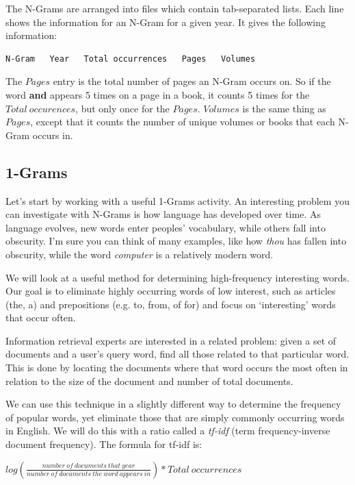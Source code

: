 \documentclass[letterpaper,10pt,openany,oneside]{sphinxmanual}
\begin{document}
The N-Grams are arranged into files
which contain tab-separated lists. Each line shows the information
for an N-Gram for a given year. It gives the following information:

\begin{Verbatim}[commandchars=\\\{\}]
N-Gram   Year   Total occurrences   Pages   Volumes
\end{Verbatim}

The $Pages$ entry is the total number of pages an N-Gram
occurs on. So if the word \textbf{and} appears 5 times on a page in a
book, it counts 5 times for the $Total \ occurences$, but
only once for the $Pages$. $Volumes$ is the same
thing as $Pages$, except that it counts the number of
unique volumes or books that each N-Gram occurs in.


\subsection{1-Grams}
\label{WmrActivities/WmrActivities:grams}
Let's start by working with a useful 1-Grams activity. An
interesting problem you can investigate with N-Grams is how
language has developed over time. As language evolves, new words
enter peoples' vocabulary, while others fall into obscurity. I'm
sure you can think of many examples, like how \emph{thou} has fallen
into obscurity, while the word \emph{computer} is a relatively modern
word.

We will look at a useful method for determining high-frequency
interesting words. Our goal is to eliminate highly occurring words
of low interest, such as articles (the, a) and prepositions (e.g.
to, from, of for) and focus on `interesting' words that occur
often.

Information retrieval experts are interested in a related problem:
given a set of documents and a user's query word, find all those
related to that particular word. This is done by locating the
documents where that word occurs the most often in relation to the
size of the document and number of total documents.

We can use this technique in a slightly different way to determine
the frequency of popular words, yet eliminate those that are simply
commonly occurring words in English. We will do this with a ratio
called a \emph{tf-idf} (term frequency-inverse document frequency). The
formula for tf-idf is:

$log\left( \frac{number \ of \ documents \ that \ year}{number \ of \ documents \ the \ word \ appears \ in} \right) * Total \ occurrences$
\end{document}
